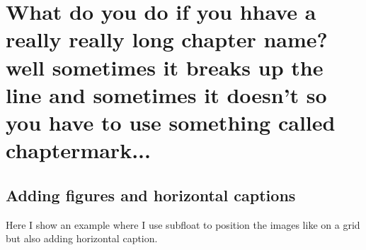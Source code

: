 

\chapter{What do you do if you hhave a really really long chapter name? well sometimes it breaks up the line and sometimes it doesn't so you have to use something called chaptermark...} \label{chap:dataset}


\newpage
\minitoc
\newpage

\section{Adding figures and horizontal captions}
Here I show an example where I use subfloat to position the images like on a grid but also adding horizontal caption.



